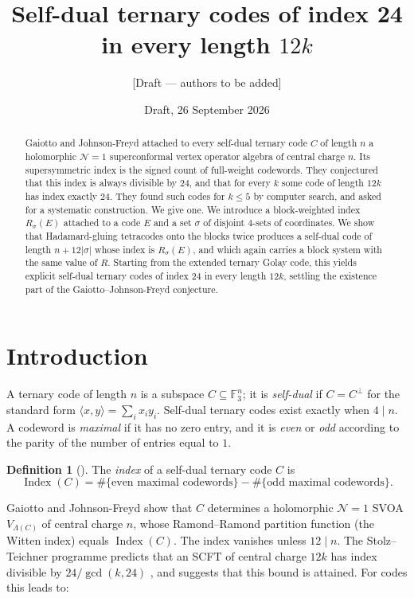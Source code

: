 \documentclass[11pt]{amsart}
\title{Self-dual ternary codes of index 24 in every length $12k$}
\author{[Draft --- authors to be added]}
\date{Draft, 26 September 2026}
\theoremstyle{definition}
\newtheorem{definition}[theorem]{Definition}
\newcommand{\F}{\mathbb{F}_3}
\newcommand{\Index}{\operatorname{Index}}
\begin{document}
\begin{abstract}
Gaiotto and Johnson-Freyd attached to every self-dual ternary code $C$ of length $n$ a holomorphic
$\mathcal N=1$ superconformal vertex operator algebra of central charge $n$. Its supersymmetric
index is the signed count of full-weight codewords. They conjectured that this index is always
divisible by $24$, and that for every $k$ some code of length $12k$ has index exactly $24$. They
found such codes for $k\le 5$ by computer search, and asked for a systematic construction.
We give one. We introduce a block-weighted index $R_\sigma(E)$ attached to a code $E$ and a set
$\sigma$ of disjoint $4$-sets of coordinates. We show that Hadamard-gluing tetracodes onto the
blocks twice produces a self-dual code of length $n+12|\sigma|$ whose index is $R_\sigma(E)$, and
which again carries a block system with the same value of $R$. Starting from the extended ternary
Golay code, this yields explicit self-dual ternary codes of index $24$ in every length $12k$,
settling the existence part of the Gaiotto--Johnson-Freyd conjecture.
\end{abstract}
\maketitle

\section{Introduction}

A ternary code of length $n$ is a subspace $C\subseteq\F^n$; it is \emph{self-dual} if
$C=C^\perp$ for the standard form $\langle x,y\rangle=\sum_i x_iy_i$. Self-dual ternary codes
exist exactly when $4\mid n$. A codeword is \emph{maximal} if it has no zero entry, and it is
\emph{even} or \emph{odd} according to the parity of the number of entries equal to $1$.

\begin{definition}[{\cite[\S1]{GJF}}]
The \emph{index} of a self-dual ternary code $C$ is
\[
  \Index(C)=\#\{\text{even maximal codewords}\}-\#\{\text{odd maximal codewords}\}.
\]
\end{definition}

Gaiotto and Johnson-Freyd \cite{GJF} show that $C$ determines a holomorphic
$\mathcal N=1$ SVOA $V_{\Lambda(C)}$ of central charge $n$, whose Ramond--Ramond partition function
(the Witten index) equals $\Index(C)$. The index vanishes unless $12\mid n$. The Stolz--Teichner
programme predicts that an SCFT of central charge $12k$ has index divisible by
$24/\gcd(k,24)$ \cite{Hopkins,GJF}, and suggests that this bound is attained. For codes this leads to:
\end{document}
